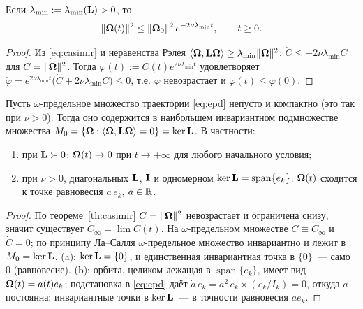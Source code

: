 \begin{corollary}\label{cor:decay}
Если $\lambda_{\min} := \lambda_{\min}(\mathbf{L}) > 0$, то
\begin{equation}\label{eq:decay}
  \|\boldsymbol{\Omega}(t)\|^2 \le \|\boldsymbol{\Omega}_0\|^2\,e^{-2\nu\lambda_{\min} t},
  \qquad t \ge 0 .
\end{equation}
\end{corollary}

\begin{proof}
Из \eqref{eq:casimir} и неравенства Рэлея
$\langle\boldsymbol{\Omega},\mathbf{L}\boldsymbol{\Omega}\rangle \ge \lambda_{\min}\|\boldsymbol{\Omega}\|^2$:
$\dot C \le -2\nu\lambda_{\min}C$ для $C = \|\boldsymbol{\Omega}\|^2$. Тогда
$\varphi(t) := C(t)e^{2\nu\lambda_{\min}t}$ удовлетворяет
$\dot\varphi = e^{2\nu\lambda_{\min}t}\bigl(\dot C + 2\nu\lambda_{\min}C\bigr)
\le 0$, т.е. $\varphi$ невозрастает и $\varphi(t) \le \varphi(0)$.
\end{proof}

\begin{theorem}[Ла--Салль]\label{th:lasalle}
Пусть $\omega$-предельное множество траектории \eqref{eq:epd}
непусто и компактно (это так при $\nu > 0$). Тогда оно содержится в
наибольшем инвариантном подмножестве множества
$M_0 = \{\boldsymbol{\Omega} : \langle\boldsymbol{\Omega},\mathbf{L}\boldsymbol{\Omega}\rangle = 0\} = \ker\mathbf{L}$. В частности:
\begin{enumerate}[label=\textup{(\alph*)}, leftmargin=2.2em, itemsep=1pt]
  \item при $\mathbf{L} \succ 0$: $\boldsymbol{\Omega}(t) \to 0$ при $t\to+\infty$ для любого
        начального условия;
  \item при $\nu > 0$, диагональных $\mathbf{L}$, $\mathbf{I}$ и одномерном
        $\ker\mathbf{L} = \operatorname{span}\{e_k\}$: $\boldsymbol{\Omega}(t)$ сходится к
        точке равновесия $a\,e_k$, $a \in \mathbb{R}$.
\end{enumerate}
\end{theorem}

\begin{proof}
По теореме~\ref{th:casimir} $C = \|\boldsymbol{\Omega}\|^2$ невозрастает и ограничена
снизу, значит существует $C_\infty = \lim C(t)$. На $\omega$-предельном
множестве $C \equiv C_\infty$ и $\dot C = 0$; по принципу
Ла--Салля \cite{lasalle} $\omega$-предельное множество инвариантно и
лежит в $M_0 = \ker\mathbf{L}$. (a): $\ker\mathbf{L} = \{0\}$, и единственная
инвариантная точка в $\{0\}$~--- само $0$ (равновесие). (b): орбита,
целиком лежащая в $\operatorname{span}\{e_k\}$, имеет вид
$\boldsymbol{\Omega}(t) = a(t)e_k$; подстановка в \eqref{eq:epd} даёт
$\dot a\,e_k = a^2\,e_k\times(e_k/I_k) = 0$, откуда $a$ постоянна:
инвариантные точки в $\ker\mathbf{L}$~--- в точности равновесия $ae_k$.
\end{proof}

